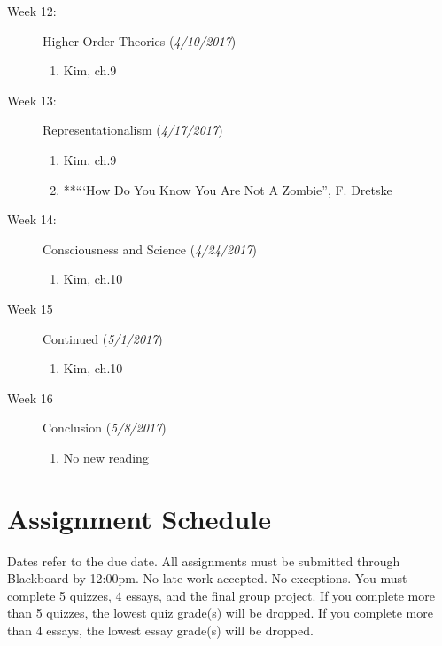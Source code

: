 \documentclass[article,oneside]{memoir}
\begin{document}
\begin{description}
\item[Week 12:] Higher Order Theories (\emph{4/10/2017})
\begin{enumerate}
\item Kim, ch.9
\end{enumerate}


\item[Week 13:] Representationalism  (\emph{4/17/2017})
\begin{enumerate}
\item Kim, ch.9
\item **``‘How Do You Know You Are Not A Zombie'', F. Dretske 
\end{enumerate}

\item[Week 14:] Consciousness and Science (\emph{4/24/2017})
\begin{enumerate}
\item Kim, ch.10
\end{enumerate}


\item[Week 15]  Continued  (\emph{5/1/2017})
\begin{enumerate}
\item  Kim, ch.10
\end{enumerate}

\item[Week 16]  Conclusion (\emph{5/8/2017})
\begin{enumerate}
\item No new reading
\end{enumerate}



\end{description}





\section{ Assignment Schedule}
Dates refer to the due date. All assignments must be submitted through Blackboard by 12:00pm. No late work accepted. No exceptions. You must complete 5 quizzes, 4 essays, and the final group project.  If you complete more than 5 quizzes, the lowest quiz grade(s) will be dropped. If you complete more than 4 essays, the lowest essay grade(s) will be dropped. 
\end{document}
